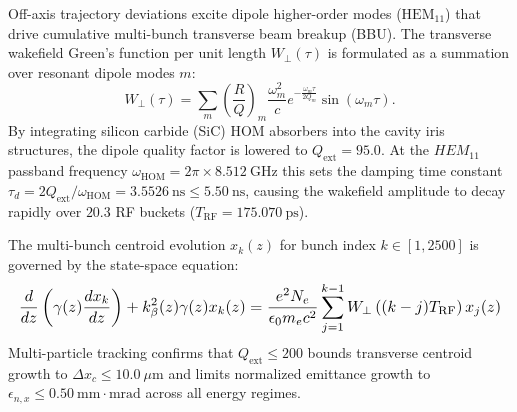Off-axis trajectory deviations excite dipole higher-order modes ($\text{HEM}_{11}$) that drive cumulative multi-bunch transverse beam breakup (BBU). The transverse wakefield Green's function per unit length $W_\perp(\tau)$ is formulated as a summation over resonant dipole modes $m$:
\begin{equation}
    W_\perp(\tau) = \sum_m \left(\frac{R}{Q}\right)_m \frac{\omega_m^2}{c} e^{-\frac{\omega_m \tau}{2 Q_m}} \sin(\omega_m \tau).
    \label{eq:wake_greens_function}
\end{equation}
By integrating silicon carbide (SiC) HOM absorbers into the cavity iris structures, the dipole quality factor is lowered to $Q_{\text{ext}} = 95.0$. At the $HEM_{11}$ passband frequency $\omega_{\text{HOM}} = 2\pi \times 8.512~\text{GHz}$ this sets the damping time constant $\tau_d = 2 Q_{\text{ext}} / \omega_{\text{HOM}} = 3.5526~\text{ns} \le 5.50~\text{ns}$, causing the wakefield amplitude to decay rapidly over $20.3$ RF buckets ($T_{\text{RF}} = 175.070~\text{ps}$).

The multi-bunch centroid evolution $x_k(z)$ for bunch index $k \in [1, 2500]$ is governed by the state-space equation:
\begin{equation}
\resizebox{\columnwidth}{!}{$\displaystyle
    \frac{d}{dz}\left(\gamma(z) \frac{d x_k}{dz}\right) + k_\beta^2(z) \gamma(z) x_k(z) = \frac{e^2 N_e}{\epsilon_0 m_e c^2} \sum_{j=1}^{k-1} W_\perp\left((k-j)T_{\text{RF}}\right) x_j(z)$}
\label{eq:bbu_differential}
\end{equation}
Multi-particle tracking confirms that $Q_{\text{ext}} \le 200$ bounds transverse centroid growth to $\Delta x_c \le 10.0~\mu\text{m}$ and limits normalized emittance growth to $\epsilon_{n,x} \le 0.50~\text{mm}\cdot\text{mrad}$ across all energy regimes.





